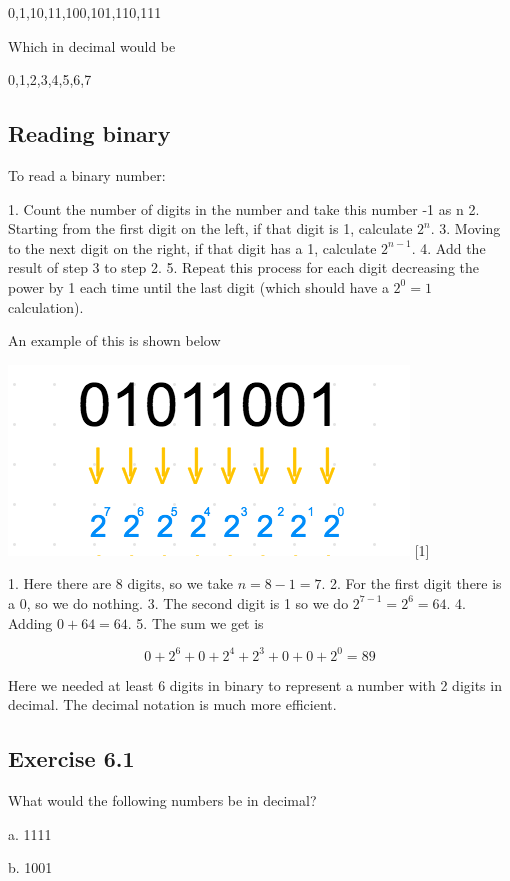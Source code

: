 \documentclass{book}
\begin{document}
0,1,10,11,100,101,110,111 

Which in decimal would be 

0,1,2,3,4,5,6,7 

\subsection{ Reading binary }

To read a binary number:  
  
1. Count the number of digits in the number and take this number -1 as n
2. Starting from the first digit on the left, if that digit is 1, calculate $2^n$. 
3. Moving to the next digit on the right, if that digit has a 1, calculate $2^{n-1}$. 
4. Add the result of step 3 to step 2. 
5. Repeat this process for each digit decreasing the power by 1 each time until the last digit (which should have a $2^0 = 1$ calculation). 

An example of this is shown below


\includegraphics[scale=0.5]{images/binary_conversion.png}
[1]

1. Here there are 8 digits, so we take $n = 8 - 1 = 7 $. 
2. For the first digit there is a 0, so we do nothing. 
3. The second digit is 1 so we do $2^{7-1} = 2^6 = 64$. 
4. Adding $0 + 64 = 64$.
5. The sum we get is

$$
0 + 2^6 +0  + 2^4 + 2^3+ 0 + 0 + 2^0 = 89 
$$

Here we needed at least 6 digits in binary to represent a number with 2 digits in decimal. The decimal notation is much more efficient. 



\subsection{Exercise 6.1}

What would the following numbers be in decimal?

a. 1111

b. 1001
\end{document}
